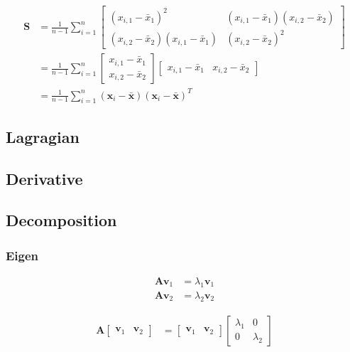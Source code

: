 \documentclass{article}
\begin{document}
\begin{align}
	\mathbf{S} & =\frac{1}{n-1}\sum_{i=1}^{n}\left[\begin{array}{cc}
		\left(x_{i,1}-\bar{x}_{1}\right)^{2} & \left(x_{i,1}-\bar{x}_{1}\right)\left(x_{i,2}-\bar{x}_{2}\right)\\
		\left(x_{i,2}-\bar{x}_{2}\right)\left(x_{i,1}-\bar{x}_{1}\right) & \left(x_{i,2}-\bar{x}_{2}\right)^{2}
	\end{array}\right]\\
	& =\frac{1}{n-1}\sum_{i=1}^{n}\left[\begin{array}{c}
		x_{i,1}-\bar{x}_{1}\\
		x_{i,2}-\bar{x}_{2}
	\end{array}\right]\left[\begin{array}{cc}
		x_{i,1}-\bar{x}_{1} & x_{i,2}-\bar{x}_{2}\end{array}\right]\\
	& =\frac{1}{n-1}\sum_{i=1}^{n}\left(\mathbf{x}_{i}-\bar{\mathbf{x}}\right)\left(\mathbf{x}_{i}-\bar{\mathbf{x}}\right)^{T}
\end{align}

\subsection{Lagragian}

\subsection{Derivative}

\subsection{Decomposition}

\subsubsection{Eigen}

\begin{align}
	\mathbf{A}\mathbf{v}_{1} & =\lambda_{1}\mathbf{v}_{1}\\
	\mathbf{A}\mathbf{v}_{2} & =\lambda_{2}\mathbf{v}_{2}
\end{align}

\begin{align}
	\mathbf{A}\left[\begin{array}{cc}
		\mathbf{v}_{1} & \mathbf{v}_{2}\end{array}\right] & =\left[\begin{array}{cc}
		\mathbf{v}_{1} & \mathbf{v}_{2}\end{array}\right]\left[\begin{array}{cc}
		\lambda_{1} & 0\\
		0 & \lambda_{2}
	\end{array}\right]
\end{align}
\end{document}
